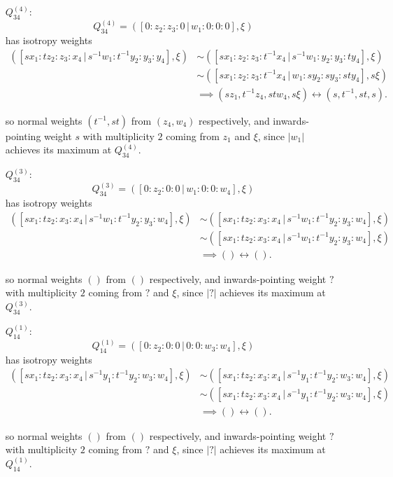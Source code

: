 \documentclass{article}
\begin{document}
\begin{itemize}
		\item[$Q_{34}^{(4)}$:]
		\[
			Q_{34}^{(4)} = \left( [ 0 : z_{2} : z_{3} : 0 \, | \, w_{1} : 0 : 0 : 0 ], \xi \right)
		\]
		has isotropy weights
		\begin{align*}
			\left( [sx_{1} : tz_{2} : z_{3} : x_{4} \, | \, s^{-1}w_{1} : t^{-1}y_{2} : y_{3} : y_{4}], \xi \right) &\sim \left( [sx_{1} : z_{2} : z_{3} : t^{-1}x_{4} \, | \, s^{-1}w_{1} : y_{2} : y_{3} : ty_{4}], \xi \right) \\ &\sim \left( [sx_{1} : z_{2} : z_{3} : t^{-1}x_{4} \, | \, w_{1} : sy_{2} : sy_{3} : sty_{4}], s\xi \right) \\ &\implies (sz_{1}, t^{-1}z_{4}, stw_{4}, s\xi) \longleftrightarrow (s, t^{-1}, st, s).
		\end{align*}
		
		so normal weights $(t^{-1}, st)$ from $(z_{4}, w_{4})$ respectively, and inwards-pointing weight $s$ with multiplicity $2$ coming from $z_{1}$ and $\xi$, since $|w_{1}|$ achieves its maximum at $Q_{34}^{(4)}$.
	
		\item[$Q_{34}^{(3)}$:]
		\[
			Q_{34}^{(3)} = \left( [ 0 : z_{2} : 0 : 0 \, | \, w_{1} : 0 : 0 : w_{4} ], \xi \right)
		\]
		has isotropy weights
		\begin{align*}
			\left( [sx_{1} : tz_{2} : x_{3} : x_{4} \, | \, s^{-1}w_{1} : t^{-1}y_{2} : y_{3} : w_{4}], \xi \right) &\sim \left( [sx_{1} : tz_{2} : x_{3} : x_{4} \, | \, s^{-1}w_{1} : t^{-1}y_{2} : y_{3} : w_{4}], \xi \right) \\ &\sim \left( [sx_{1} : tz_{2} : x_{3} : x_{4} \, | \, s^{-1}w_{1} : t^{-1}y_{2} : y_{3} : w_{4}], \xi \right) \\ &\implies () \longleftrightarrow ().
		\end{align*}
		
		so normal weights $()$ from $()$ respectively, and inwards-pointing weight $?$ with multiplicity $2$ coming from $?$ and $\xi$, since $|?|$ achieves its maximum at $Q_{34}^{(3)}$.
	
		\item[$Q_{14}^{(1)}$:]
		\[
		Q_{14}^{(1)} = \left( [ 0 : z_{2} : 0 : 0 \, | \, 0 : 0 : w_{3} : w_{4} ], \xi \right)
		\]
		has isotropy weights
		\begin{align*}
			\left( [sx_{1} : tz_{2} : x_{3} : x_{4} \, | \, s^{-1}y_{1} : t^{-1}y_{2} : w_{3} : w_{4}], \xi \right) &\sim \left( [sx_{1} : tz_{2} : x_{3} : x_{4} \, | \, s^{-1}y_{1} : t^{-1}y_{2} : w_{3} : w_{4}], \xi \right) \\ &\sim \left( [sx_{1} : tz_{2} : x_{3} : x_{4} \, | \, s^{-1}y_{1} : t^{-1}y_{2} : w_{3} : w_{4}], \xi \right) \\ &\implies () \longleftrightarrow ().
		\end{align*}
		
		so normal weights $()$ from $()$ respectively, and inwards-pointing weight $?$ with multiplicity $2$ coming from $?$ and $\xi$, since $|?|$ achieves its maximum at $Q_{14}^{(1)}$.
		
	
	\end{itemize}
	
\end{document}

